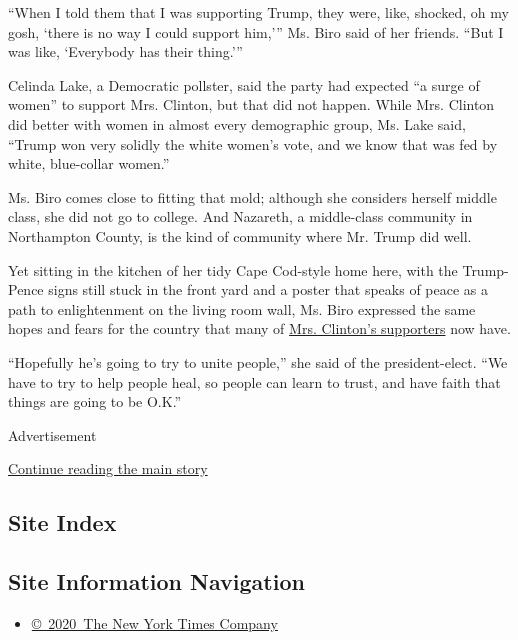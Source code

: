 ``When I told them that I was supporting Trump, they were, like,
shocked, oh my gosh, `there is no way I could support him,''' Ms. Biro
said of her friends. ``But I was like, `Everybody has their thing.'''

Celinda Lake, a Democratic pollster, said the party had expected ``a
surge of women'' to support Mrs. Clinton, but that did not happen. While
Mrs. Clinton did better with women in almost every demographic group,
Ms. Lake said, ``Trump won very solidly the white women's vote, and we
know that was fed by white, blue-collar women.''

Ms. Biro comes close to fitting that mold; although she considers
herself middle class, she did not go to college. And Nazareth, a
middle-class community in Northampton County, is the kind of community
where Mr. Trump did well.

Yet sitting in the kitchen of her tidy Cape Cod-style home here, with
the Trump-Pence signs still stuck in the front yard and a poster that
speaks of peace as a path to enlightenment on the living room wall, Ms.
Biro expressed the same hopes and fears for the country that many of
\href{http://www.nytimes3xbfgragh.onion/2016/11/11/us/politics/female-clinton-supporters-are-left-feeling-gutted.html}{Mrs.
Clinton's supporters} now have.

``Hopefully he's going to try to unite people,'' she said of the
president-elect. ``We have to try to help people heal, so people can
learn to trust, and have faith that things are going to be O.K.''

Advertisement

\protect\hyperlink{after-bottom}{Continue reading the main story}

\hypertarget{site-index}{%
\subsection{Site Index}\label{site-index}}

\hypertarget{site-information-navigation}{%
\subsection{Site Information
Navigation}\label{site-information-navigation}}

\begin{itemize}
\tightlist
\item
  \href{https://help.nytimes3xbfgragh.onion/hc/en-us/articles/115014792127-Copyright-notice}{©~2020~The
  New York Times Company}
\end{itemize}

